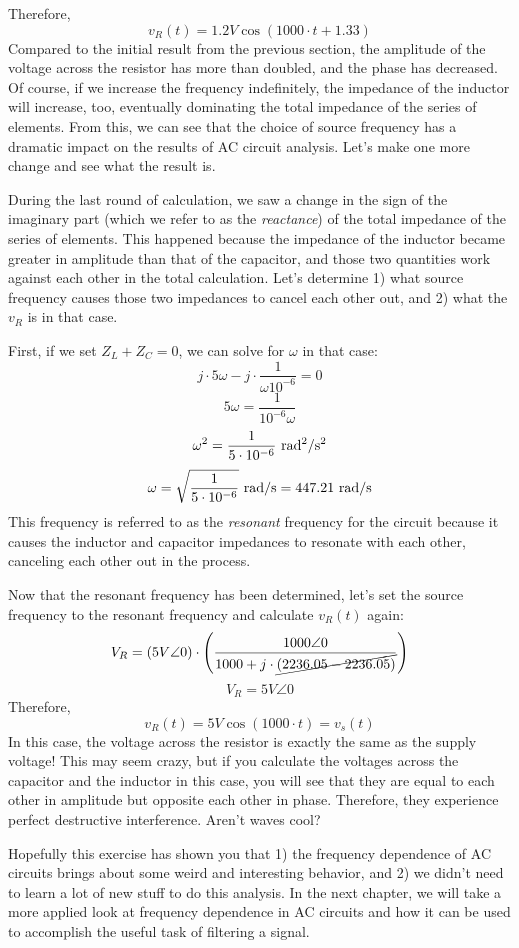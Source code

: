 Therefore,
$$
v_R(t) = 1.2V\cos(1000\cdot t +1.33)
$$
Compared to the initial result from the previous section, the amplitude of the voltage across the resistor has more than doubled, and the phase has decreased. Of course, if we increase the frequency indefinitely, the impedance of the inductor will increase, too, eventually dominating the total impedance of the series of elements. From this, we can see that the choice of source frequency has a dramatic impact on the results of AC circuit analysis. Let's make one more change and see what the result is.
\par 
During the last round of calculation, we saw a change in the sign of the imaginary part (which we refer to as the \textit{reactance}) of the total impedance of the series of elements. This happened because the impedance of the inductor became greater in amplitude than that of the capacitor, and those two quantities work against each other in the total calculation. Let's determine 1) what source frequency causes those two impedances to cancel each other out, and 2) what the $v_R$ is in that case.
\par
First, if we set $Z_L+Z_C=0$, we can solve for $\omega$ in that case:
$$
j\cdot5\omega -j\cdot\frac{1}{\omega10^{-6}}= 0
$$
$$
5\omega = \frac{1}{10^{-6}\omega}
$$
$$
\omega^{2} = \frac{1}{5\cdot10^{-6}} \textnormal{ rad$^2$/s$^2$}
$$
$$
\omega = \sqrt{\frac{1}{5\cdot10^{-6}}}\textnormal{ rad/s} = 447.21 \textnormal{ rad/s}
$$
This frequency is referred to as the \textit{resonant} frequency for the circuit because it causes the inductor and capacitor impedances to resonate with each other, canceling each other out in the process. 
\par
Now that the resonant frequency has been determined, let's set the source frequency to the resonant frequency and calculate $v_R(t)$ again:
$$
V_R = (5V\angle0)\cdot\left(\frac{1000\angle0}{1000 + j\cdot\cancel{(2236.05 - 2236.05)}}\right)
$$
$$
V_R = 5V\angle0
$$
Therefore,
$$
v_R(t) = 5V\cos(1000\cdot t) = v_s(t)
$$
In this case, the voltage across the resistor is exactly the same as the supply voltage! This may seem crazy, but if you calculate the voltages across the capacitor and the inductor in this case, you will see that they are equal to each other in amplitude but opposite each other in phase. Therefore, they experience perfect destructive interference. Aren't waves cool?
\par
Hopefully this exercise has shown you that 1) the frequency dependence of AC circuits brings about some weird and interesting behavior, and 2) we didn't need to learn a lot of new stuff to do this analysis. In the next chapter, we will take a more applied look at frequency dependence in AC circuits and how it can be used to accomplish the useful task of filtering a signal.

